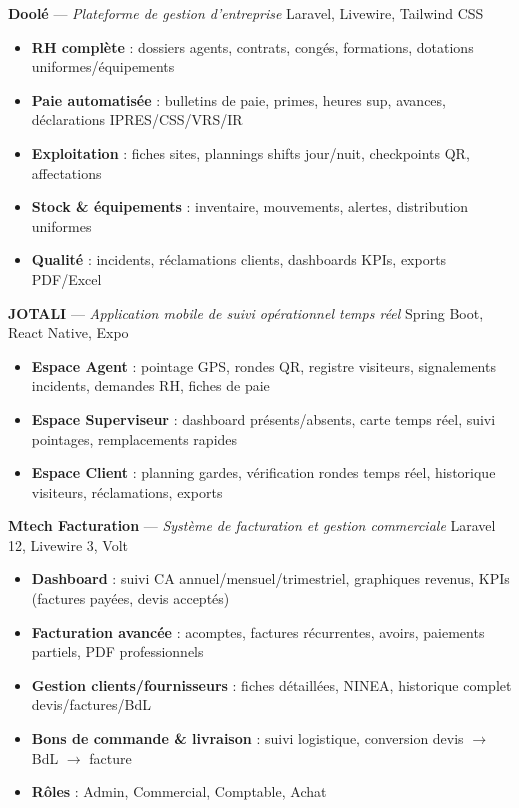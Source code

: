 \documentclass[a4paper,11pt]{article}
\begin{document}
{\textbf{\color{darktext}Doolé} — \textit{Plateforme de gestion d'entreprise}} \hfill {\small\color{graytext}Laravel, Livewire, Tailwind CSS}
\begin{itemize}[leftmargin=12pt, itemsep=0pt, topsep=2pt]
    \item \textbf{RH complète} : dossiers agents, contrats, congés, formations, dotations uniformes/équipements
    \item \textbf{Paie automatisée} : bulletins de paie, primes, heures sup, avances, déclarations IPRES/CSS/VRS/IR
    \item \textbf{Exploitation} : fiches sites, plannings shifts jour/nuit, checkpoints QR, affectations
    \item \textbf{Stock \& équipements} : inventaire, mouvements, alertes, distribution uniformes
    \item \textbf{Qualité} : incidents, réclamations clients, dashboards KPIs, exports PDF/Excel
\end{itemize}

\vspace{3pt}

{\textbf{\color{darktext}JOTALI} — \textit{Application mobile de suivi opérationnel temps réel}} \hfill {\small\color{graytext}Spring Boot, React Native, Expo}
\begin{itemize}[leftmargin=12pt, itemsep=0pt, topsep=2pt]
    \item \textbf{Espace Agent} : pointage GPS, rondes QR, registre visiteurs, signalements incidents, demandes RH, fiches de paie
    \item \textbf{Espace Superviseur} : dashboard présents/absents, carte temps réel, suivi pointages, remplacements rapides
    \item \textbf{Espace Client} : planning gardes, vérification rondes temps réel, historique visiteurs, réclamations, exports
\end{itemize}

\vspace{3pt}

{\textbf{\color{darktext}Mtech Facturation} — \textit{Système de facturation et gestion commerciale}} \hfill {\small\color{graytext}Laravel 12, Livewire 3, Volt}
\begin{itemize}[leftmargin=12pt, itemsep=0pt, topsep=2pt]
    \item \textbf{Dashboard} : suivi CA annuel/mensuel/trimestriel, graphiques revenus, KPIs (factures payées, devis acceptés)
    \item \textbf{Facturation avancée} : acomptes, factures récurrentes, avoirs, paiements partiels, PDF professionnels
    \item \textbf{Gestion clients/fournisseurs} : fiches détaillées, NINEA, historique complet devis/factures/BdL
    \item \textbf{Bons de commande \& livraison} : suivi logistique, conversion devis $\rightarrow$ BdL $\rightarrow$ facture
    \item \textbf{Rôles} : Admin, Commercial, Comptable, Achat
\end{itemize}
\end{document}
